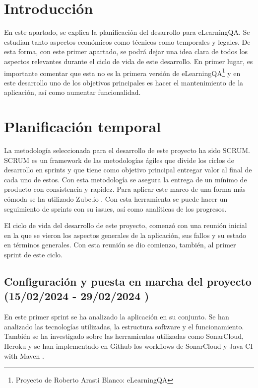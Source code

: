
\section{Introducción}
En este apartado, se explica la planificación del desarrollo para eLearningQA. Se estudian tanto aspectos económicos como técnicos como temporales y legales. De esta forma, con este primer apartado, se podrá dejar una idea clara de todos los aspectos relevantes durante el ciclo de vida de este desarrollo. En primer lugar, es importante comentar que esta no es la primera versión de eLearningQA\footnote{Proyecto de Roberto Arasti Blanco: eLearningQA\label{tfg-RobertoArasto}} y en este desarrollo uno de los objetivos principales es hacer el mantenimiento de la aplicación, así como aumentar funcionalidad.

\section{Planificación temporal}
La metodología seleccionada para el desarrollo de este proyecto ha sido SCRUM. SCRUM es un framework de las metodologías ágiles que divide los ciclos de desarrollo en sprints y que tiene como objetivo principal entregar valor al final de cada uno de estos. Con esta metodología se asegura la entrega de un mínimo de producto con consistencia y rapidez. Para aplicar este marco de una forma más cómoda se ha utilizado Zube.io \cite{zube}. Con esta herramienta se puede hacer un seguimiento de sprints con su issues, así como analíticas de los progresos.

El ciclo de vida del desarrollo de este proyecto, comenzó con una reunión inicial en la que se vieron los aspectos generales de la aplicación, sus fallos y su estado en términos generales. Con esta reunión se dio comienzo, también, al primer sprint de este ciclo.

\subsection{Configuración y puesta en marcha del proyecto (15/02/2024 - 29/02/2024 ) }
En este primer sprint se ha analizado la aplicación en su conjunto. Se han analizado las tecnologías utilizadas, la estructura software y el funcionamiento. También se ha investigado sobre las herramientas utilizadas como SonarCloud, Heroku y se han implementado en Github los workflows de SonarCloud \cite{sonar-github} y Java CI with Maven \cite{java-maven-ci}.

